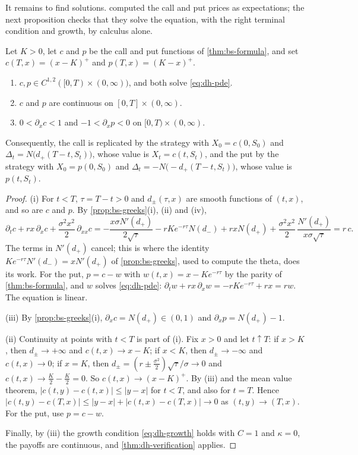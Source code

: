 It remains to find solutions.  computed the call and put
prices as expectations; the next proposition checks that they solve the equation, with the
right terminal condition and growth, by calculus alone.

\begin{proposition}\label{prop:dh-bs-solution}
Let $K>0$, let $c$ and $p$ be the call and put functions of \cref{thm:bs-formula}, and set
$c(T,x)=(x-K)^+$ and $p(T,x)=(K-x)^+$.
\begin{enumerate}[label=(\roman*)]
  \item $c,p\in C^{1,2}([0,T)\times(0,\infty))$, and both solve \eqref{eq:dh-pde}.
  \item $c$ and $p$ are continuous on $[0,T]\times(0,\infty)$.
  \item $0<\partial_xc<1$ and $-1<\partial_xp<0$ on $[0,T)\times(0,\infty)$.
\end{enumerate}
Consequently, the call is replicated by the strategy with $X_0=c(0,S_0)$ and
$\Delta_t=N\big(d_+(T-t,S_t)\big)$, whose value is $X_t=c(t,S_t)$, and the put by the strategy
with $X_0=p(0,S_0)$ and $\Delta_t=-N\big(-d_+(T-t,S_t)\big)$, whose value is $p(t,S_t)$.
\end{proposition}

\begin{proof}
(i) For $t<T$, $\tau=T-t>0$ and $d_\pm(\tau,x)$ are smooth functions of $(t,x)$, and so are
$c$ and $p$. By \cref{prop:bs-greeks}(i), (ii) and (iv),
\[
  \partial_tc+rx\,\partial_xc+\frac{\sigma^2x^2}{2}\,\partial_{xx}c
  =-\frac{x\sigma N'(d_+)}{2\sqrt\tau}-rKe^{-r\tau}N(d_-)+rxN(d_+)+\frac{\sigma^2x^2}{2}\,\frac{N'(d_+)}{x\sigma\sqrt\tau}
  =r\,c .
\]
The terms in $N'(d_+)$ cancel; this is where the identity $Ke^{-r\tau}N'(d_-)=xN'(d_+)$ of
\cref{prop:bs-greeks}, used to compute the theta, does its work. For the put, $p=c-w$ with
$w(t,x)=x-Ke^{-r\tau}$ by the parity of \cref{thm:bs-formula}, and $w$ solves
\eqref{eq:dh-pde}: $\partial_tw+rx\,\partial_xw=-rKe^{-r\tau}+rx=rw$. The equation is linear.

(iii) By \cref{prop:bs-greeks}(i), $\partial_xc=N(d_+)\in(0,1)$ and $\partial_xp=N(d_+)-1$.

(ii) Continuity at points with $t<T$ is part of (i). Fix $x>0$ and let $t\uparrow T$: if $x>K$,
then $d_\pm\to+\infty$ and $c(t,x)\to x-K$; if $x<K$, then $d_\pm\to-\infty$ and $c(t,x)\to0$;
if $x=K$, then $d_\pm=(r\pm\frac{\sigma^2}{2})\sqrt\tau/\sigma\to0$ and
$c(t,x)\to\frac K2-\frac K2=0$. So $c(t,x)\to(x-K)^+$. By (iii) and the mean value theorem,
$|c(t,y)-c(t,x)|\le|y-x|$ for $t<T$, and also for $t=T$. Hence
$|c(t,y)-c(T,x)|\le|y-x|+|c(t,x)-c(T,x)|\to0$ as $(t,y)\to(T,x)$. For the put, use $p=c-w$.

Finally, by (iii) the growth condition \eqref{eq:dh-growth} holds with $C=1$ and $\kappa=0$, the
payoffs are continuous, and \cref{thm:dh-verification} applies.
\end{proof}

